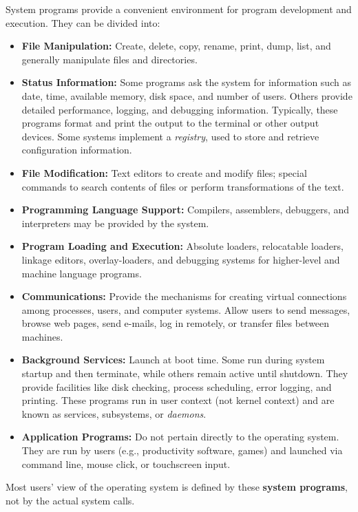     System programs provide a convenient environment for program development and execution. They can be divided into:
    \begin{itemize}
        \item \textbf{File Manipulation:} Create, delete, copy, rename, print, dump, list, and generally manipulate files and directories.
        \item \textbf{Status Information:} Some programs ask the system for information such as date, time, available memory, disk space, and number of users. Others provide detailed performance, logging, and debugging information. Typically, these programs format and print the output to the terminal or other output devices. Some systems implement a \emph{registry}, used to store and retrieve configuration information.
        \item \textbf{File Modification:} Text editors to create and modify files; special commands to search contents of files or perform transformations of the text.
        \item \textbf{Programming Language Support:} Compilers, assemblers, debuggers, and interpreters may be provided by the system.
        \item \textbf{Program Loading and Execution:} Absolute loaders, relocatable loaders, linkage editors, overlay-loaders, and debugging systems for higher-level and machine language programs.
        \item \textbf{Communications:} Provide the mechanisms for creating virtual connections among processes, users, and computer systems. Allow users to send messages, browse web pages, send e-mails, log in remotely, or transfer files between machines.
        \item \textbf{Background Services:} Launch at boot time. Some run during system startup and then terminate, while others remain active until shutdown. They provide facilities like disk checking, process scheduling, error logging, and printing. These programs run in user context (not kernel context) and are known as services, subsystems, or \emph{daemons}.
        \item \textbf{Application Programs:} Do not pertain directly to the operating system. They are run by users (e.g., productivity software, games) and launched via command line, mouse click, or touchscreen input.
    \end{itemize}
    Most users’ view of the operating system is defined by these \textbf{system programs}, not by the actual system calls.


